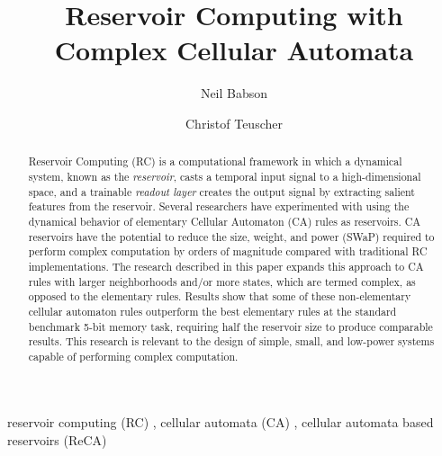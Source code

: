 \documentclass{elsarticle}
\begin{document}
\begin{frontmatter}
	
	\title{Reservoir Computing with Complex Cellular Automata}
	\author{Neil Babson} %
	
	\author{Christof Teuscher}
	\address{Portland State University, P.O.  Box 751, Portland, OR 97207-0751, 
	USA}
	
	
	
	
	\begin{abstract}
		Reservoir Computing (RC) is a computational framework in which a dynamical system, 
		known as the \textit{reservoir}, casts a temporal input signal to a 
		high-dimensional space, and a trainable \textit{readout layer} 
		creates the output signal by extracting salient features from the 
		reservoir.
		Several researchers 
		have experimented with using the dynamical behavior of elementary Cellular 
		Automaton (CA) rules as reservoirs. CA reservoirs have the potential to reduce 
		the size, weight, and power (SWaP) required to perform complex computation by 
		orders of magnitude compared with traditional RC implementations. The research 
		described in this paper expands this approach to CA rules with larger 
		neighborhoods and/or more states, which are termed complex, as opposed to the 
		elementary rules.  Results show that some of these non-elementary cellular 
		automaton rules outperform the best elementary rules at the standard benchmark 
		5-bit memory task, requiring half the reservoir size to produce comparable 
		results. This research is relevant to the design of  simple, small, and 
		low-power systems capable of performing complex computation.
		
	\end{abstract}
	
	
	\begin{keyword}
		reservoir computing (RC) \sep
		cellular automata (CA) \sep
		cellular automata based reservoirs (ReCA)
		
	\end{keyword}
	
\end{frontmatter}
\end{document}
